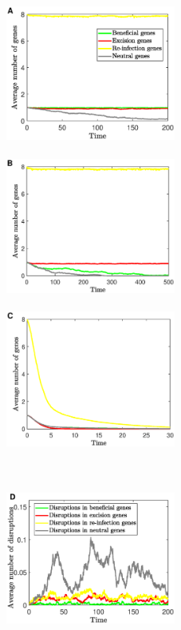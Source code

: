  \begin{figure}[H]
    \centering
     \begin{subfigure}[t]{0.30\textwidth} 
    \includegraphics[height=1.8in,width=2.2in]{persisA}
     \end{subfigure}\hfill
         \begin{subfigure}[t]{0.30\textwidth}
    \includegraphics[height=1.8in,width=2.2in]{persisB}
    \end{subfigure}\hfill  
    \begin{subfigure}[t]{0.30\textwidth}
        \includegraphics[height=1.8in,width=2.2in]{persisC}
    \end{subfigure}\hfill  \\  
      \begin{subfigure}[t]{0.30\textwidth} 
    \includegraphics[height=1.8in,width=2.2in]{persisISD}

\end{subfigure}
\end{figure}
